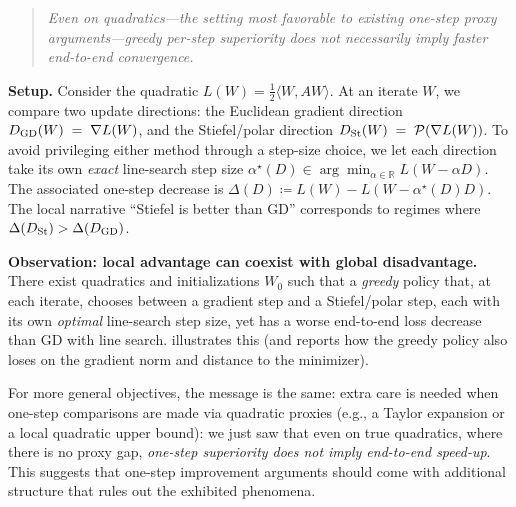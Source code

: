 \documentclass{article}
\theoremstyle{plain}
\theoremstyle{definition}
\theoremstyle{remark}
\newcommand{\R}{\mathbb{R}}
\newcommand{\loss}{L}
\newcommand{\proj}{\mathcal{P}}
\newcommand{\GD}{\textsc{GD}}
\newcommand{\Muon}{\textsc{Muon}}
\newcommand\AG[1]{\textcolor{magenta}{#1}}
\begin{document}
\begin{quote}
\emph{Even on quadratics---the setting most favorable to 
existing one-step proxy arguments---greedy per-step superiority does not necessarily imply faster end-to-end convergence.}
\end{quote}

\textbf{Setup.}
Consider the quadratic $\loss(W) = \frac12 \langle W, A W\rangle$. 
At an iterate $W$, we compare two update directions:
the Euclidean gradient direction $D_{\rm GD}(W)\;=\;\nabla \loss(W)$, 
and the Stiefel/polar direction
$
D_{\rm St}(W)\;=\;\proj(\nabla \loss(W))$. 
To avoid privileging either method through a step-size choice, we let each direction take its own \emph{exact} line-search step size 
$\alpha^\star(D) \in \arg\min_{\alpha\in\R} \loss(W - \alpha D)$. The associated one-step 
decrease is $\Delta(D) \coloneqq \loss(W) - \loss(W - \alpha^\star(D) D)$. 
The local narrative ``Stiefel is better than \GD{}'' corresponds to regimes where $\Delta(D_{\rm St}) > \Delta(D_{\rm GD})$.

\textbf{Observation: local advantage can coexist with global disadvantage.}
There exist quadratics and initializations $W_0$ such that 
a \emph{greedy} policy that, at each iterate,
chooses between a gradient step and a Stiefel/polar step, each with its own 
\emph{optimal} line-search step size, 
yet has a worse end-to-end loss decrease than \GD{} with line search. 
 illustrates this 
(and  reports how the greedy policy 
also loses on the gradient norm and distance to the minimizer). 

For more general objectives, the message is the same: 
extra care is needed when one-step comparisons are made via 
quadratic proxies (e.g., a Taylor expansion or a local quadratic upper bound): 
we just saw that even on true quadratics, where there is no proxy gap, 
\emph{one-step superiority does not imply end-to-end speed-up}. 
This suggests that one-step improvement arguments should come 
with additional structure that rules out the exhibited phenomena. 
\end{document}
